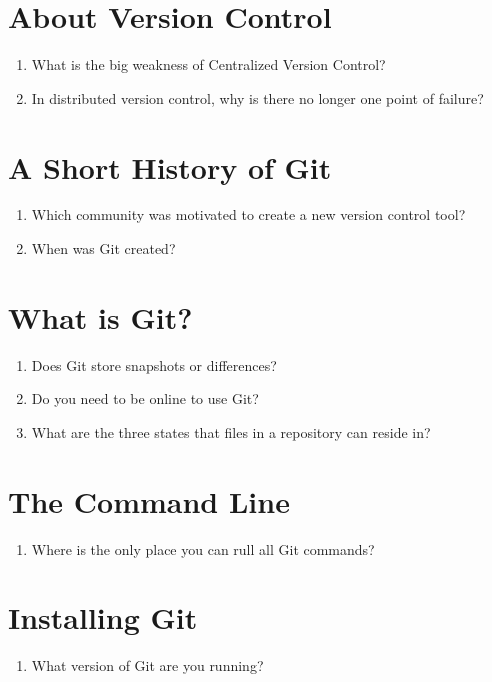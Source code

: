 \section{About Version Control}
\begin{enumerate}
    \item What is the big weakness of Centralized Version Control?
    \item In distributed version control, why is there no longer one point 
        of failure?
\end{enumerate}

\section{A Short History of Git}
\begin{enumerate}
    \item Which community was motivated to create a new version control
        tool?
    \item When was Git created?
\end{enumerate}

\section{What is Git?}
\begin{enumerate}
    \item Does Git store snapshots or differences?
    \item Do you need to be online to use Git?
    \item What are the three states that files in a repository can reside 
        in?
\end{enumerate}

\section{The Command Line}
\begin{enumerate}
    \item Where is the only place you can rull all Git commands?
\end{enumerate}

\section{Installing Git}
\begin{enumerate}
    \item What version of Git are you running?
\end{enumerate}

